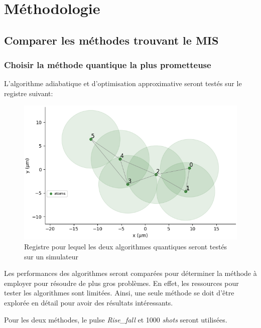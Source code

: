\documentclass[11pt]{article}
\begin{document}
\section{Méthodologie}

\subsection{Comparer les méthodes trouvant le MIS}
\subsubsection{Choisir la méthode quantique la plus prometteuse}
L'algorithme adiabatique et d'optimisation approximative seront testés sur le registre suivant: 

\begin{figure}[H]
    \centering
    \includegraphics[width = 0.48\linewidth]{images/registre_exemple2.png}
    \caption{Registre pour lequel les deux algorithmes quantiques seront testés sur un simulateur}
\end{figure}\label{graphtocompare}

Les performances des algorithmes seront comparées pour déterminer la méthode à employer pour résoudre de plus gros problèmes. En effet, les ressources pour tester les algorithmes sont limitées. Ainsi, une seule méthode se doit d'être explorée en détail pour avoir des résultats intéressants.

Pour les deux méthodes, le pulse \textit{Rise\_fall} et 1000 \textit{shots} seront utilisées.
\end{document}
